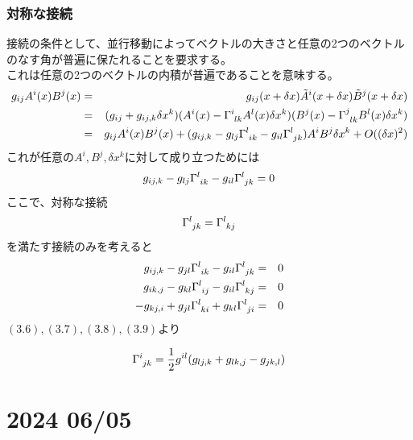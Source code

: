 \documentclass[dvipdfmx]{report} %
\begin{document}
\subsection{
	対称な接続
}
接続の条件として、並行移動によってベクトルの大きさと任意の2つのベクトルのなす角が普遍に保たれることを要求する。\\
これは任意の2つのベクトルの内積が普遍であることを意味する。\\
\begin{eqnarray*}
g_{ij} A^i(x)B^j(x) &=& g_{ij}(x + \delta x) \tilde{A}^i(x+\delta x) \tilde{B}^j(x+\delta x)\\
&=& (g_{ij} + g_{ij,k}\delta x^k)(A^i(x) - \tensor{\Gamma}{^i_{lk}}A^l(x) \delta x^k) (B^j(x) - \tensor{\Gamma}{^j_{lk}}B^l(x) \delta x^k)\\
&=& g_{ij} A^i(x)B^j(x) + (g_{ij,k} - g_{lj}\tensor{\Gamma}{^l_{ik}} - g_{il}\tensor{\Gamma}{^l_{jk}} )A^i B^j \delta x^k + O((\delta x)^2)
\end{eqnarray*}
これが任意の$A^i, B^j, \delta x^k$に対して成り立つためには
\begin{eqnarray*}
 g_{ij,k} - g_{lj}\tensor{\Gamma}{^l_{ik}} - g_{il}\tensor{\Gamma}{^l_{jk}} = 0
 \end{eqnarray*}
 ここで、対称な接続
\begin{eqnarray}
\tensor{\Gamma}{^l_{jk}} = \tensor{\Gamma}{^l_{kj}}
\end{eqnarray}
 を満たす接続のみを考えると
\begin{eqnarray}
 g_{ij,k} - g_{jl}\tensor{\Gamma}{^l_{ik}} - g_{il}\tensor{\Gamma}{^l_{jk}} &=& 0\\
 g_{ik,j} - g_{kl}\tensor{\Gamma}{^l_{ij}} - g_{il}\tensor{\Gamma}{^l_{kj}} &=& 0\\
 - g_{kj,i} + g_{jl}\tensor{\Gamma}{^l_{ki}} + g_{kl}\tensor{\Gamma}{^l_{ji}} &=& 0
\end{eqnarray}
$(3.6), (3.7), (3.8), (3.9)$より
\begin{tcolorbox}[title=クリストッフェル記号]
\begin{eqnarray*}
	\tensor{\Gamma}{^i_{jk}} = \frac{1}{2} g^{il} (g_{lj,k} + g_{lk,j} - g_{jk,l})
\end{eqnarray*}
\end{tcolorbox}

\chapter{2024 06/05}
\end{document}
